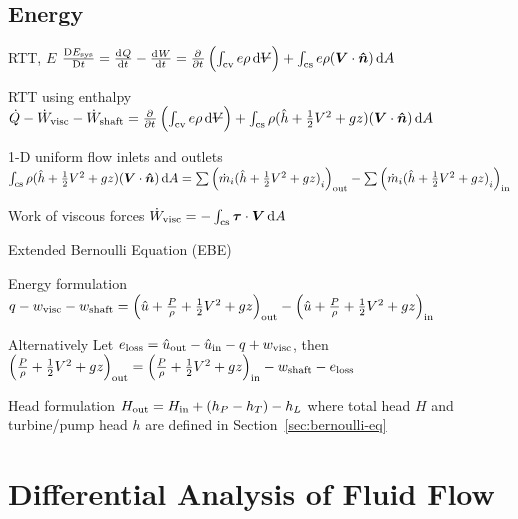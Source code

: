 \documentclass{article}
\begin{document}
\subsection{Energy}
\begin{description*}
\item[RTT, $E$]
  \(\frac{\Dif E_\mrm{sys}}{\Dif t}
  = \od{Q}{t}-\od{W}{t}
  = \pd{}{t}\left(\int_\mrm{cv}e\rho\dif{\volsym}\right)
  + \int_\mrm{cs}e\rho(\vec{V}\cdot\uvec{n})\dif{A}\)
\item[RTT using enthalpy]
  \(\dot{Q}-\dot{W}_\mrm{visc}-\dot{W}_\mrm{shaft}
  = \pd{}{t}\left(\int_\mrm{cv}e\rho\dif{\volsym}\right)
  + \int_\mrm{cs}\rho(\hat{h}+\frac{1}{2}V^2+gz)(\vec{V}\cdot\uvec{n})\dif{A}\)
\item[1-D uniform flow inlets and outlets]~\\
  \(\int_\mrm{cs}\rho(\hat{h}+\frac{1}{2}V^2+gz)(\vec{V}\cdot\uvec{n})\dif{A}
  = \sum{\left(\dot{m}_i{(\hat{h}+\frac{1}{2}V^2+gz)}_i\right)}_\mrm{out}
  - \sum{\left(\dot{m}_i{(\hat{h}+\frac{1}{2}V^2+gz)}_i\right)}_\mrm{in}\)
\item[Work of viscous forces]
  \(\dot{W}_\mrm{visc} = -\int_\mrm{cs}\vec\tau\cdot\vec{V}\dif{A}\)
\item[Extended Bernoulli Equation (EBE)]~
  \begin{description*}
  \item[Energy formulation]
    \(q - w_{\mathrm{visc}} - w_{\mathrm{shaft}}
    = {\left(\hat{u}+\frac{P}{\rho}+\frac{1}{2}V^2+gz\right)}_{\mathrm{out}}
    - {\left(\hat{u}+\frac{P}{\rho}+\frac{1}{2}V^2+gz\right)}_{\mathrm{in}}\)
  \item[Alternatively]
    Let \(e_{\mathrm{loss}} = \hat{u}_{\mathrm{out}}-\hat{u}_{\mathrm{in}}-q+w_{\mathrm{visc}}\), then \\
    \({\left(\frac{P}{\rho}+\frac{1}{2}V^2+gz\right)}_{\mathrm{out}}
    = {\left(\frac{P}{\rho}+\frac{1}{2}V^2+gz\right)}_{\mathrm{in}}
    - w_{\mathrm{shaft}} - e_{\mathrm{loss}}\)
  \item[Head formulation]
    \(H_{\mathrm{out}} = H_{\mathrm{in}} + (h_P-h_T) - h_L\)
    where total head $H$ and turbine\slash{}pump head $h$ are defined in
    Section~\ref{sec:bernoulli-eq}
  \end{description*}
\end{description*}

\section{Differential Analysis of Fluid Flow}
\end{document}
